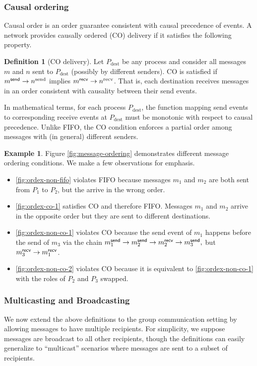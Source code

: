 \documentclass[]             %
{NASA}                       %
\theoremstyle{definition}
\newtheorem{example}[theorem]{Example}
\newtheorem{definition}[theorem]{Definition}
\providecommand{\tightlist}{%
  \setlength{\itemsep}{0pt}\setlength{\parskip}{0pt}}
\begin{document}
\subsubsection{Causal ordering}
Causal order is an order guarantee consistent with causal precedence
of events. A network provides causally ordered (CO) delivery if it
satisfies the following property.
\begin{definition}[CO delivery]
  \label{def:causalorder}
  Let $P_\mathrm{dest}$ be any process and consider all messages $m$
  and $n$ sent to $P_\mathrm{dest}$ (possibly by different senders).
  CO is satisfied if $m_{}^{\mathsf{send}} \to n^\textrm{send}$ implies
  $m_{}^{\mathsf{recv}} \to n^\textrm{recv}$. That is, each destination receives
  messages in an order consistent with causality between their send
  events.
\end{definition}
In mathematical terms, for each process $P_{\mathrm{dest}}$, the
function mapping send events to corresponding receive events at
$P_{\mathrm{dest}}$ must be monotonic with respect to causal
precedence.  Unlike FIFO, the CO condition enforces a partial order
among messages with (in general) different senders.

\begin{example}
  Figure \ref{fig:message-ordering} demonstrates different message
  ordering conditions. We make a few observations for emphasis.

  \begin{itemize}
    \tightlist
  \item \ref{fig:ordex-non-fifo} violates FIFO because messages $m_1$
    and $m_2$ are both sent from $P_1$ to $P_2$, but the arrive in the wrong order.
  \item \ref{fig:ordex-co-1} satisfies CO and therefore FIFO. Messages
    $m_1$ and $m_2$ arrive in the opposite order but they are sent to
    different destinations.
  \item \ref{fig:ordex-non-co-1} violates CO because the send event of
    $m_1$ happens before the send of $m_3$ via the chain
    $m_{1}^{\mathsf{send}} \to m_{2}^{\mathsf{send}} \to m_{2}^{\mathsf{recv}} \to m_{3}^{\mathsf{send}},$ but
    $m_{3}^{\mathsf{recv}} \to m_{1}^{\mathsf{recv}}$.
  \item \ref{fig:ordex-non-co-2} violates CO because it is equivalent to
    \ref{fig:ordex-non-co-1} with the roles of $P_2$ and $P_3$ swapped.
  \end{itemize}
\end{example}

\subsubsection{Multicasting and Broadcasting}
\label{sssec:multicasting}
We now extend the above definitions to the group communication setting
by allowing messages to have multiple recipients. For simplicity, we
suppose messages are broadcast to all other recipients, though the
definitions can easily generalize to ``multicast'' scenarios where
messages are sent to a subset of recipients.
\end{document}
